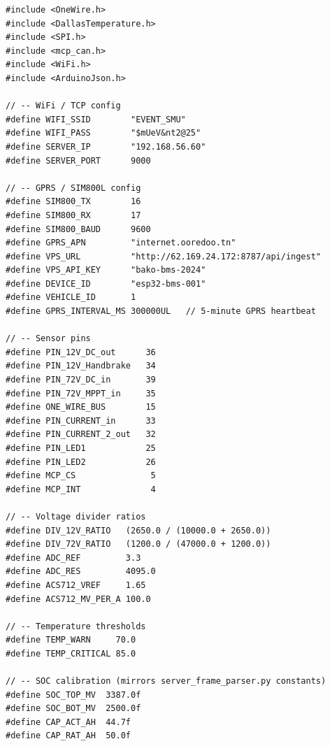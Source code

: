 \begin{lstlisting}[caption={ESP32 firmware --- configuration and pin definitions}, label={lst:fw-config}]
#include <OneWire.h>
#include <DallasTemperature.h>
#include <SPI.h>
#include <mcp_can.h>
#include <WiFi.h>
#include <ArduinoJson.h>

// -- WiFi / TCP config
#define WIFI_SSID        "EVENT_SMU"
#define WIFI_PASS        "$mUeV&nt2@25"
#define SERVER_IP        "192.168.56.60"
#define SERVER_PORT      9000

// -- GPRS / SIM800L config
#define SIM800_TX        16
#define SIM800_RX        17
#define SIM800_BAUD      9600
#define GPRS_APN         "internet.ooredoo.tn"
#define VPS_URL          "http://62.169.24.172:8787/api/ingest"
#define VPS_API_KEY      "bako-bms-2024"
#define DEVICE_ID        "esp32-bms-001"
#define VEHICLE_ID       1
#define GPRS_INTERVAL_MS 300000UL   // 5-minute GPRS heartbeat

// -- Sensor pins
#define PIN_12V_DC_out      36
#define PIN_12V_Handbrake   34
#define PIN_72V_DC_in       39
#define PIN_72V_MPPT_in     35
#define ONE_WIRE_BUS        15
#define PIN_CURRENT_in      33
#define PIN_CURRENT_2_out   32
#define PIN_LED1            25
#define PIN_LED2            26
#define MCP_CS               5
#define MCP_INT              4

// -- Voltage divider ratios
#define DIV_12V_RATIO   (2650.0 / (10000.0 + 2650.0))
#define DIV_72V_RATIO   (1200.0 / (47000.0 + 1200.0))
#define ADC_REF         3.3
#define ADC_RES         4095.0
#define ACS712_VREF     1.65
#define ACS712_MV_PER_A 100.0

// -- Temperature thresholds
#define TEMP_WARN     70.0
#define TEMP_CRITICAL 85.0

// -- SOC calibration (mirrors server_frame_parser.py constants)
#define SOC_TOP_MV  3387.0f
#define SOC_BOT_MV  2500.0f
#define CAP_ACT_AH  44.7f
#define CAP_RAT_AH  50.0f
\end{lstlisting}

